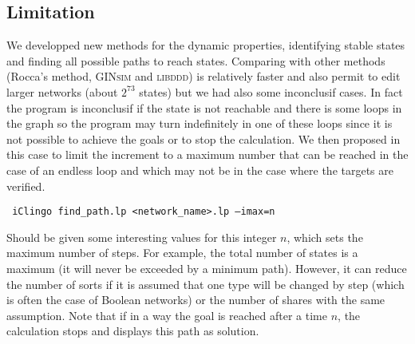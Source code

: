 \subsection{Limitation}

We developped new methods for the dynamic properties, 
identifying stable states and finding all possible paths to reach states. Comparing with other methods (Rocca's method, \textsc{GINsim} and \textsc{libddd}) is relatively faster and also permit to edit larger networks (about $2^{73}$ states) but we had also some inconclusif cases. In fact the program is inconclusif if the state is not reachable and there is some loops in the graph so the program may turn indefinitely in one of these loops since it is not possible to achieve the goals or to stop the calculation. We then proposed in this case to limit the increment to a maximum number that can be reached in the case of an endless loop and which may not be in the case where the targets are verified.
\begin{tabbing}
 \texttt{ iClingo find\_path.lp <network\_name>.lp --imax=n}
\end{tabbing}
Should be given some interesting values for this integer $ n $, which sets the maximum number of steps. For example, the total number of states is a maximum (it will never be exceeded by a minimum path). However, it can reduce the number of sorts if it is assumed that one type will be changed by step (which is often the case of Boolean networks) or the number of shares with the same assumption.
Note that if in a way the goal is reached after a time $n$, the calculation stops and displays this path as solution. 